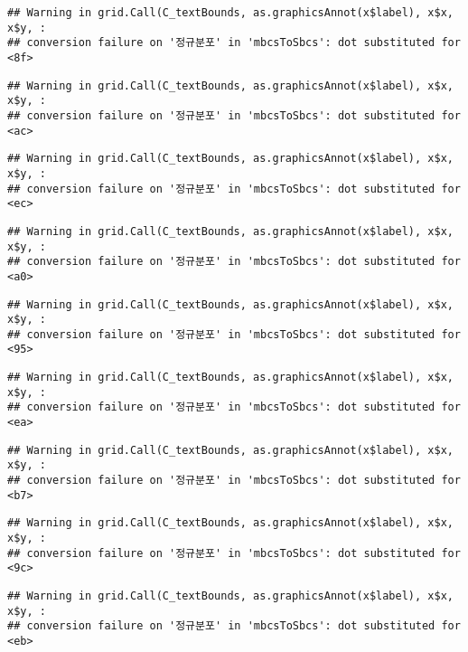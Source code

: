\documentclass[]{book}
\begin{document}
\begin{verbatim}
## Warning in grid.Call(C_textBounds, as.graphicsAnnot(x$label), x$x, x$y, :
## conversion failure on '정규분포' in 'mbcsToSbcs': dot substituted for <8f>
\end{verbatim}

\begin{verbatim}
## Warning in grid.Call(C_textBounds, as.graphicsAnnot(x$label), x$x, x$y, :
## conversion failure on '정규분포' in 'mbcsToSbcs': dot substituted for <ac>
\end{verbatim}

\begin{verbatim}
## Warning in grid.Call(C_textBounds, as.graphicsAnnot(x$label), x$x, x$y, :
## conversion failure on '정규분포' in 'mbcsToSbcs': dot substituted for <ec>
\end{verbatim}

\begin{verbatim}
## Warning in grid.Call(C_textBounds, as.graphicsAnnot(x$label), x$x, x$y, :
## conversion failure on '정규분포' in 'mbcsToSbcs': dot substituted for <a0>
\end{verbatim}

\begin{verbatim}
## Warning in grid.Call(C_textBounds, as.graphicsAnnot(x$label), x$x, x$y, :
## conversion failure on '정규분포' in 'mbcsToSbcs': dot substituted for <95>
\end{verbatim}

\begin{verbatim}
## Warning in grid.Call(C_textBounds, as.graphicsAnnot(x$label), x$x, x$y, :
## conversion failure on '정규분포' in 'mbcsToSbcs': dot substituted for <ea>
\end{verbatim}

\begin{verbatim}
## Warning in grid.Call(C_textBounds, as.graphicsAnnot(x$label), x$x, x$y, :
## conversion failure on '정규분포' in 'mbcsToSbcs': dot substituted for <b7>
\end{verbatim}

\begin{verbatim}
## Warning in grid.Call(C_textBounds, as.graphicsAnnot(x$label), x$x, x$y, :
## conversion failure on '정규분포' in 'mbcsToSbcs': dot substituted for <9c>
\end{verbatim}

\begin{verbatim}
## Warning in grid.Call(C_textBounds, as.graphicsAnnot(x$label), x$x, x$y, :
## conversion failure on '정규분포' in 'mbcsToSbcs': dot substituted for <eb>
\end{verbatim}
\end{document}

